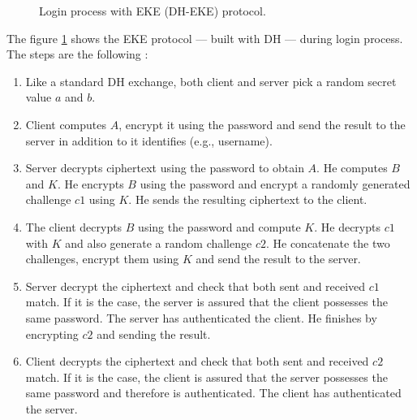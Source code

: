 ﻿\documentclass[../report.tex]{subfiles}
\begin{document}
\begin{figure}[h]
 \centering
 \setlength{\fboxsep}{10pt}
 \setlength{\fboxrule}{1pt}
 \caption{Login process with EKE (DH-EKE) protocol.}
 \label{fig:EKE_DH}
\end{figure}


The figure \ref{fig:EKE_DH} shows the EKE protocol --- built with DH ---  during login process.
The steps are the following :


\begin{enumerate}
 \item Like a standard DH exchange, both client and server pick a random secret value $a$ and $b$.
 \item Client computes $A$, encrypt it using the password and send the result to the server in addition to it identifies (e.g., username).
 \item Server decrypts ciphertext using the password to obtain $A$. He computes $B$ and $K$. He encrypts $B$ using the password and encrypt a randomly generated challenge $c1$ using $K$. He sends the resulting ciphertext to the client.
 \item The client decrypts $B$ using the password and compute $K$. He decrypts $c1$ with $K$ and also generate a random challenge $c2$. He concatenate the two challenges, encrypt them using $K$ and send the result to the server.
 \item Server decrypt the ciphertext and check that both sent and received $c1$ match. If it is the case, the server is assured that the client possesses the same password. The server has authenticated the client. He finishes by encrypting $c2$ and sending the result.
 \item Client decrypts the ciphertext and check that both sent and received $c2$ match. If it is the case, the client is assured that the server possesses the same password and therefore is authenticated. The client has authenticated the server.
\end{enumerate}
\end{document}
